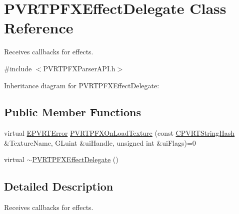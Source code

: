 \hypertarget{class_p_v_r_t_p_f_x_effect_delegate}{\section{P\+V\+R\+T\+P\+F\+X\+Effect\+Delegate Class Reference}
\label{class_p_v_r_t_p_f_x_effect_delegate}
}


Receives callbacks for effects.  




{\ttfamily \#include $<$P\+V\+R\+T\+P\+F\+X\+Parser\+A\+P\+I.\+h$>$}



Inheritance diagram for P\+V\+R\+T\+P\+F\+X\+Effect\+Delegate\+:
\subsection*{Public Member Functions}
\begin{DoxyCompactItemize}
\item 
virtual \hyperlink{_p_v_r_t_error_8h_a9e837ff1a83f3a5f332bc4cc78454608}{E\+P\+V\+R\+T\+Error} \hyperlink{class_p_v_r_t_p_f_x_effect_delegate_abebd5d9925cdefba61ea5a72ad50feab}{P\+V\+R\+T\+P\+F\+X\+On\+Load\+Texture} (const \hyperlink{class_c_p_v_r_t_string_hash}{C\+P\+V\+R\+T\+String\+Hash} \&Texture\+Name, G\+Luint \&ui\+Handle, unsigned int \&ui\+Flags)=0
\item 
virtual \hyperlink{class_p_v_r_t_p_f_x_effect_delegate_ae241aaabe6abbedca2daa5b82071a94b}{$\sim$\+P\+V\+R\+T\+P\+F\+X\+Effect\+Delegate} ()
\end{DoxyCompactItemize}


\subsection{Detailed Description}
Receives callbacks for effects. 



 

